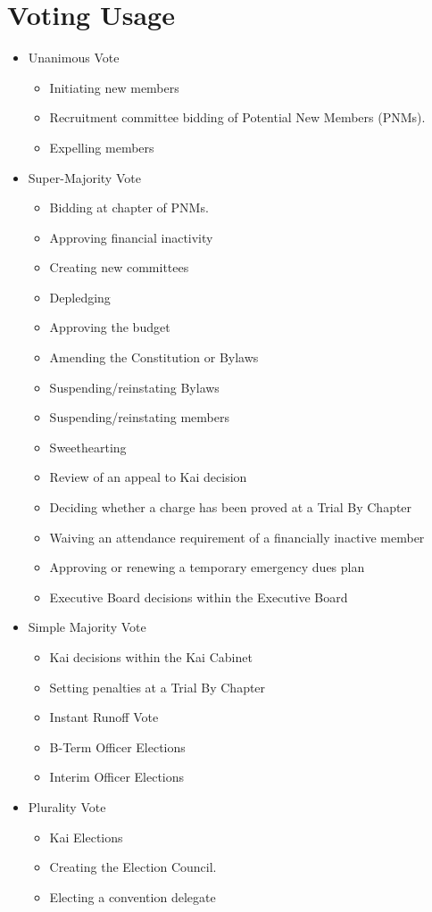 \section{Voting Usage}
\begin{itemize}
\item[] Unanimous Vote
\begin{itemize}
\item Initiating new members
\item Recruitment committee bidding of Potential New Members (PNMs).
\item Expelling members
\end{itemize}
\item[] Super-Majority Vote
\begin{itemize}
\item Bidding at chapter of PNMs.
\item Approving financial inactivity
\item Creating new committees
\item Depledging
\item Approving the budget
\item Amending the Constitution or Bylaws
\item Suspending/reinstating Bylaws
\item Suspending/reinstating members
\item Sweethearting
\item Review of an appeal to Kai decision
\item Deciding whether a charge has been proved at a Trial By Chapter
\item Waiving an attendance requirement of a financially inactive member
\item Approving or renewing a temporary emergency dues plan
\item Executive Board decisions within the Executive Board
\end{itemize}
\item[] Simple Majority Vote
\begin{itemize}
\item Kai decisions within the Kai Cabinet
\item Setting penalties at a Trial By Chapter
\item Instant Runoff Vote
\item B-Term Officer Elections
\item Interim Officer Elections
\end{itemize}
\item[] Plurality Vote
\begin{itemize}
\item Kai Elections
\item Creating the Election Council.
\item Electing a convention delegate
\end{itemize}
\end{itemize}

